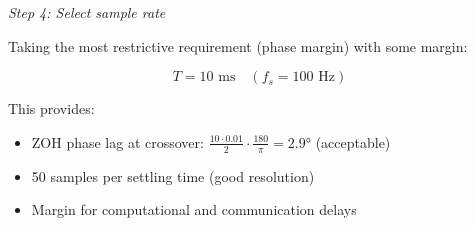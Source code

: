 \begin{example}
\textit{Step 4: Select sample rate}

Taking the most restrictive requirement (phase margin) with some margin:

\begin{equation}
\boxed{T = 10 \text{ ms} \quad (f_s = 100 \text{ Hz})}
\end{equation}

This provides:
\begin{itemize}
    \item ZOH phase lag at crossover: $\frac{10 \cdot 0.01}{2} \cdot \frac{180}{\pi} = 2.9°$ (acceptable)
    \item 50 samples per settling time (good resolution)
    \item Margin for computational and communication delays
\end{itemize}
\end{example}

